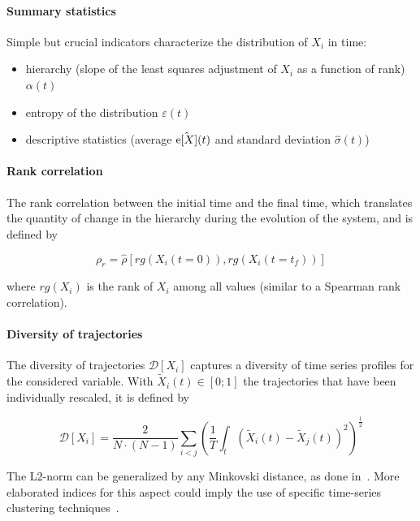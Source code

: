 \paragraph{Summary statistics}

Simple but crucial indicators characterize the distribution of $X_i$ in time:
\begin{itemize}
	\item hierarchy (slope of the least squares adjustment of $X_i$ as a function of rank) $\alpha (t)$
	\item entropy of the distribution $\varepsilon (t)$
	\item descriptive statistics (average $\hat{\mathrm{e}\!\left[X\right]} (t)$ and standard deviation $\hat{\sigma} (t)$)
\end{itemize}


\paragraph{Rank correlation}

The rank correlation between the initial time and the final time, which translates the quantity of change in the hierarchy during the evolution of the system, and is defined by

\begin{equation}
\rho_r = \hat{\rho}\left[rg(X_i(t=0)),rg(X_i(t=t_f))\right]
\end{equation}

where $rg(X_i)$ is the rank of $X_i$ among all values (similar to a Spearman rank correlation).


\paragraph{Diversity of trajectories}

The diversity of trajectories $\mathcal{D}\left[X_i\right]$ captures a diversity of time series profiles for the considered variable. With $\tilde{X}_i(t)\in \left[0;1\right]$ the trajectories that have been individually rescaled, it is defined by

\begin{equation}
\mathcal{D}\left[X_i\right] = \frac{2}{N\cdot(N-1)}\sum_{i<j} \left(\frac{1}{T}\int_{t} \left(\tilde{X}_i(t) - \tilde{X}_j(t)\right)^2 \right)^{\frac{1}{2}}
\end{equation}

The L2-norm can be generalized by any Minkovski distance, as done in~\cite{raimbault2016hybrid}. More elaborated indices for this aspect could imply the use of specific time-series clustering techniques~\cite{liao2005clustering}.


